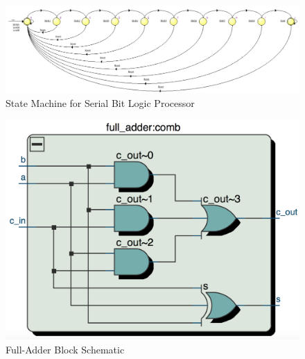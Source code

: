 \documentclass[journal, twocolumn, final,11pt,letterpaper]{IEEEtran}
\begin{document}
\begin{figure} [htbp]
	\centering
	\includegraphics[scale=0.4]{state-machine-processor.png}
	\caption{State Machine for Serial Bit Logic Processor \label{fig:serial-processor-state-machine}}
\end{figure}

\begin{figure} [htbp]
	\centering
	\includegraphics[scale=0.4]{full-adder-block-schematic.png}
	\caption{Full-Adder Block Schematic\label{fig:full-adder-block-schematic}}
\end{figure}
\end{document}
